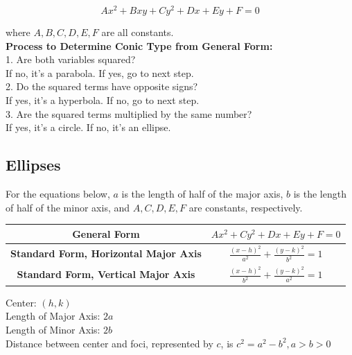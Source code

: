         \begin{equation*}
            Ax^2+Bxy+Cy^2+Dx+Ey+F=0
        \end{equation*}

        \noindent where $A,B,C,D,E,F$ are all constants. \\

        \noindent \color{purple} \textbf{Process to Determine Conic Type from General Form:} \color{black} \\
        1. Are both variables squared? \\
        If no, it's a parabola. If yes, go to next step. \\
        2. Do the squared terms have opposite signs? \\
        If yes, it's a hyperbola. If no, go to next step. \\
        3. Are the squared terms multiplied by the same number? \\
        If yes, it's a circle. If no, it's an ellipse.



    \pagebreak
    \subsection{Ellipses}
        For the equations below, $a$ is the length of half of the major axis, $b$ is the length of
        half of the minor axis, and $A,C,D,E,F$ are constants, respectively. \\

        \begin{center}
            \begin{tabular}{|c|c|}
                \hline
                \textbf{General Form}
                & $Ax^2+Cy^2+Dx+Ey+F=0$                       \\
                \hline
                \textbf{Standard Form, Horizontal Major Axis}
                & $\frac{(x-h)^2}{a^2}+\frac{(y-k)^2}{b^2}=1$ \\
                \hline
                \textbf{Standard Form, Vertical Major Axis}
                & $\frac{(x-h)^2}{b^2}+\frac{(y-k)^2}{a^2}=1$ \\
                \hline
            \end{tabular}
        \end{center}

        \noindent Center: $(h,k)$ \\
        Length of Major Axis: $2a$ \\
        Length of Minor Axis: $2b$ \\
        Distance between center and foci, represented by $c$, is $c^2=a^2-b^2,a>b>0$ \\

